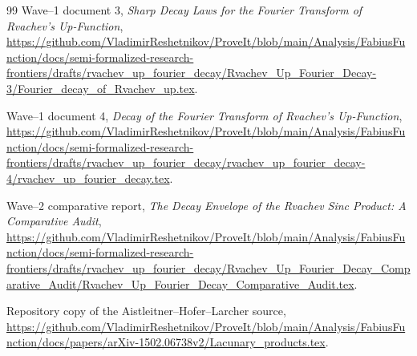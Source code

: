 \documentclass[11pt,oneside]{article}
\theoremstyle{definition}
\theoremstyle{remark}
\begin{document}
\begin{thebibliography}{99}
\newblock Wave--1 document 3,
\newblock \emph{Sharp Decay Laws for the Fourier Transform of Rvachev's Up-Function},
\newblock \url{https://github.com/VladimirReshetnikov/ProveIt/blob/main/Analysis/FabiusFunction/docs/semi-formalized-research-frontiers/drafts/rvachev_up_fourier_decay/Rvachev_Up_Fourier_Decay-3/Fourier_decay_of_Rvachev_up.tex}.

\newblock Wave--1 document 4,
\newblock \emph{Decay of the Fourier Transform of Rvachev's Up-Function},
\newblock \url{https://github.com/VladimirReshetnikov/ProveIt/blob/main/Analysis/FabiusFunction/docs/semi-formalized-research-frontiers/drafts/rvachev_up_fourier_decay/rvachev_up_fourier_decay-4/rvachev_up_fourier_decay.tex}.

\newblock Wave--2 comparative report,
\newblock \emph{The Decay Envelope of the Rvachev Sinc Product: A Comparative Audit},
\newblock \url{https://github.com/VladimirReshetnikov/ProveIt/blob/main/Analysis/FabiusFunction/docs/semi-formalized-research-frontiers/drafts/rvachev_up_fourier_decay/Rvachev_Up_Fourier_Decay_Comparative_Audit/Rvachev_Up_Fourier_Decay_Comparative_Audit.tex}.

\newblock Repository copy of the Aistleitner--Hofer--Larcher source,
\newblock \url{https://github.com/VladimirReshetnikov/ProveIt/blob/main/Analysis/FabiusFunction/docs/papers/arXiv-1502.06738v2/Lacunary_products.tex}.

\end{thebibliography}
\end{document}

